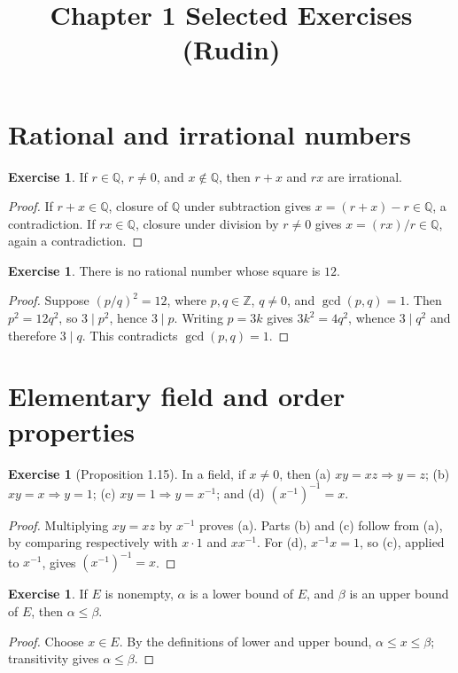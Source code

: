 \documentclass[12pt]{article}
\title{Chapter 1 Selected Exercises (Rudin)}
\date{}
\theoremstyle{definition}
\newtheorem{exercise}[theorem]{Exercise}
\newcommand{\Q}{\mathbb Q}
\begin{document}
\maketitle

\section{Rational and irrational numbers}
\begin{exercise}
If $r\in\Q$, $r\ne0$, and $x\notin\Q$, then $r+x$ and $rx$ are irrational.
\end{exercise}
\begin{proof}
If $r+x\in\Q$, closure of $\Q$ under subtraction gives
$x=(r+x)-r\in\Q$, a contradiction.  If $rx\in\Q$, closure under division by
$r\ne0$ gives $x=(rx)/r\in\Q$, again a contradiction.
\end{proof}

\begin{exercise}
There is no rational number whose square is $12$.
\end{exercise}
\begin{proof}
Suppose $(p/q)^2=12$, where $p,q\in\mathbb Z$, $q\ne0$, and
$\gcd(p,q)=1$.  Then $p^2=12q^2$, so $3\mid p^2$, hence $3\mid p$.
Writing $p=3k$ gives $3k^2=4q^2$, whence $3\mid q^2$ and therefore
$3\mid q$.  This contradicts $\gcd(p,q)=1$.
\end{proof}

\section{Elementary field and order properties}
\begin{exercise}[Proposition 1.15]
In a field, if $x\ne0$, then (a) $xy=xz\Rightarrow y=z$;
(b) $xy=x\Rightarrow y=1$; (c) $xy=1\Rightarrow y=x^{-1}$; and
(d) $(x^{-1})^{-1}=x$.
\end{exercise}
\begin{proof}
Multiplying $xy=xz$ by $x^{-1}$ proves (a).  Parts (b) and (c) follow
from (a), by comparing respectively with $x\cdot1$ and $x x^{-1}$.
For (d), $x^{-1}x=1$, so (c), applied to $x^{-1}$, gives
$(x^{-1})^{-1}=x$.
\end{proof}

\begin{exercise}
If $E$ is nonempty, $\alpha$ is a lower bound of $E$, and $\beta$ is an
upper bound of $E$, then $\alpha\le\beta$.
\end{exercise}
\begin{proof}
Choose $x\in E$.  By the definitions of lower and upper bound,
$\alpha\le x\le\beta$; transitivity gives $\alpha\le\beta$.
\end{proof}
\end{document}
